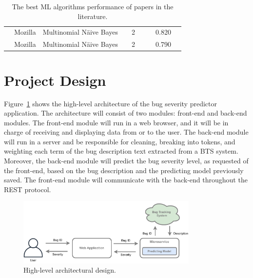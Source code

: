 \documentclass[a4paper]{article}
\begin{document}
\begin{table}[htp]
\begin{tabular}{@{}p{}p{}p{}p{}ccccc@{}}
        \cmidrule{1-9}
        \cite{Jin:2016b}                    &  Mozilla                          &  Multinomial Näive Bayes                       &  & 2 &                                     &                   &  0.820             &                                           \\ 
        \cmidrule{1-9}
        \cite{Jin:2016c}                    &  Mozilla                          &  Multinomial Näive Bayes                        &  & 2 &                                     &     &  0.790             &                                           \\ 
        \bottomrule
        \end{tabular}
        \caption{The best ML algorithms performance of papers in the literature.}
        \label{tab:performance_of_algorithms}
    \end{table}

\section{Project Design}
Figure~\ref{fig:application-architecture} shows the high-level architecture of the bug severity predictor application. The architecture will consist of two modules: front-end and back-end modules. The front-end module will run in a web browser, and it will be in charge of receiving and displaying data from or to the user. The back-end module will run in a server and be responsible for cleaning, breaking into tokens, and weighting each term of the bug description text extracted from a BTS system. Moreover, the back-end module will predict the bug severity level, as requested of the front-end, based on the bug description and the predicting model previously saved. The front-end module will communicate with the back-end throughout the REST protocol. 
\begin{figure}[h!]
    \centering
    \includegraphics[width=0.8\textwidth]{udacity-capstone-project.pdf}
    \caption{High-level architectural design.}
    \label{fig:application-architecture}
\end{figure}
\end{document}
